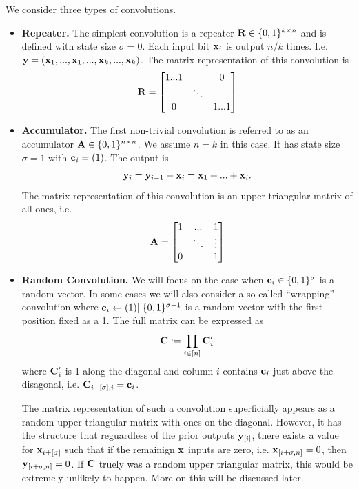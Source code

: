 We consider three types of convolutions. 
\begin{itemize}
    \item \textbf{Repeater.} The simplest convolution is a repeater $\mathbf{R}\in \{0,1\}^{k\times n}$ and is defined with state size $\sigma=0$. Each input bit $\mathbf{x}_i$ is output $n/k$ times. I.e. $\mathbf{y} = (\mathbf{x}_1,...,\mathbf{x}_1,...,\mathbf{x}_k,...,\mathbf{x}_k)$. The matrix representation of this convolution is 
    $$
\mathbf{R}=\begin{bmatrix}
    1 ... 1 &    &0\\
            &\ddots&\\
     0       &&1...1
\end{bmatrix}
    $$


    \item \textbf{Accumulator.} The first non-trivial convolution is referred to as an accumulator $\mathbf{A}\in \{0,1\}^{n\times n}$. We assume $n=k$ in this case. It has state size $\sigma=1$ with $\mathbf{c}_i=(1)$. The output is 
$$
    \mathbf{y}_i=\mathbf{y}_{i-1}+\mathbf{x}_i=\mathbf{x}_1 +...+\mathbf{x}_i.
$$
The matrix representation of this convolution is an upper triangular matrix of all ones, i.e.
$$
\mathbf{A}=\begin{bmatrix}
    1  & ...   &1\\
            &\ddots&\vdots\\
    0        &&1
\end{bmatrix}
$$
    \item \textbf{Random Convolution.}
We will focus on the case when $\mathbf{c}_i\in\{0,1\}^\sigma$ is a random vector. In some cases we will also consider a so called ``wrapping'' convolution where $\mathbf{c}_i\gets (1) || \{0,1\}^{\sigma-1}$ is a random vector with the first position fixed as a 1. The full matrix can be expressed as 
$$
\mathbf{C} := \prod_{i\in [n]} \mathbf{C}'_i
$$
where $\mathbf{C}'_i$ is 1 along the diagonal and column $i$ contains $\mathbf{c}_i$ just above the disagonal, i.e. $\mathbf{C}_{i-[\sigma],i} = \mathbf{c}_i$. 

The matrix representation of such a convolution superficially appears as a random upper triangular matrix with ones on the diagonal. However, it has the structure that reguardless of the prior outputs $\mathbf{y}_{[i]}$, there exists a value for $\mathbf{x}_{i+[\sigma]}$ such that if the remainign $\mathbf{x}$ inputs are zero, i.e. $\mathbf{x}_{[i+\sigma, n]}=0$, then $\mathbf{y}_{[i+\sigma, n]}=0$. If $\mathbf{C}$ truely was a random upper triangular matrix, this would be extremely unlikely to happen. More on this will be discussed later.

\end{itemize}
